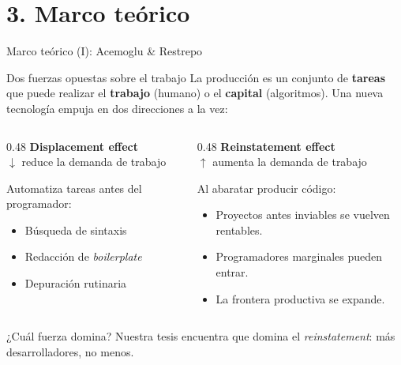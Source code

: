 \documentclass[10pt,aspectratio=169]{beamer}
\begin{document}
\section{3. Marco teórico}

\begin{frame}{Marco teórico (I): Acemoglu \& Restrepo}
\begin{block}{Dos fuerzas opuestas sobre el trabajo}
\small La producción es un conjunto de \textbf{tareas} que puede realizar el \textbf{trabajo} (humano) o el \textbf{capital} (algoritmos). Una nueva tecnología empuja en dos direcciones a la vez:
\end{block}

\begin{columns}[T]
\begin{column}{0.48\textwidth}
\textbf{\textcolor{pucpaccent}{Displacement effect}}\\
{\small\textcolor{pucpaccent}{$\downarrow$ reduce la demanda de trabajo}}
\medskip

\small Automatiza tareas antes del programador:
\begin{itemize}\small
  \item Búsqueda de sintaxis
  \item Redacción de \textit{boilerplate}
  \item Depuración rutinaria
\end{itemize}
\end{column}
\begin{column}{0.48\textwidth}
\textbf{\textcolor{pucpblue}{Reinstatement effect}}\\
{\small\textcolor{pucpblue}{$\uparrow$ aumenta la demanda de trabajo}}
\medskip

\small Al abaratar producir código:
\begin{itemize}\small
  \item Proyectos antes inviables se vuelven rentables.
  \item Programadores marginales pueden entrar.
  \item La frontera productiva se expande.
\end{itemize}
\end{column}
\end{columns}

\vspace{0.8em}
\centering \small ¿Cuál fuerza domina? \alert{Nuestra tesis encuentra que domina el \textit{reinstatement}: más desarrolladores, no menos.}
\end{frame}
\end{document}
